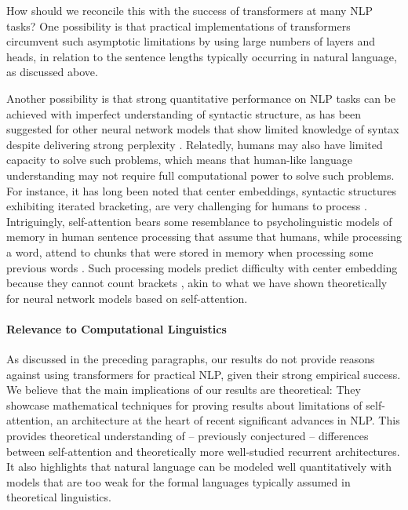 \documentclass[11pt,a4paper]{article}
\begin{document}
How should we reconcile this with the success of transformers at many NLP tasks?
One possibility is that practical implementations of transformers circumvent such asymptotic limitations by using large numbers of layers and heads, in relation to the sentence lengths typically occurring in natural language, as discussed above.

Another possibility is that strong quantitative performance on NLP tasks can be achieved with imperfect understanding of syntactic structure, as has been suggested for other neural network models that show limited knowledge of syntax despite delivering strong perplexity  \cite{linzen2016assessing,marvin2018targeted}.
Relatedly, humans may also have limited capacity to solve such problems, which means that human-like language understanding may not require full computational power to solve such problems.
For instance, it has long been noted that center embeddings, syntactic structures exhibiting iterated bracketing, are very challenging for humans to process \cite{miller-finitary-1963,gibson1999memory}.
Intriguingly, self-attention bears some resemblance to psycholinguistic models of memory in human sentence processing that assume that humans, while processing a word, attend to chunks that were stored in memory when processing some previous words \cite{lewis2005activation,parker2017cue}.
Such processing models predict difficulty with center embedding because they cannot count brackets \cite{lewis2005activation}, akin to what we have shown theoretically for neural network models based on self-attention.

\paragraph{Relevance to Computational Linguistics}
As discussed in the preceding paragraphs, our results do not provide reasons against using transformers for practical NLP, given their strong empirical success. %
We believe that the main implications of our results are theoretical:
They showcase mathematical techniques for proving results about limitations of self-attention, an architecture at the heart of recent significant advances in NLP.
This provides theoretical understanding of -- previously conjectured -- differences between self-attention and theoretically more well-studied recurrent architectures.
It also highlights that natural language can be modeled well quantitatively with models that are too weak for the formal languages typically assumed in theoretical linguistics.
\end{document}
